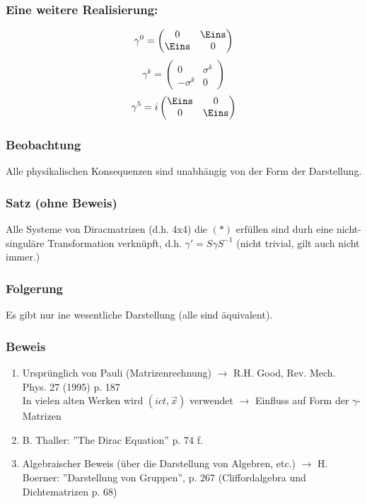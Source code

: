 \documentclass[twoside,a4paper]{scrartcl}
\renewcommand{\1}{\mathds{1}}
\newcommand{\ra}{\rightarrow}
\begin{document}
\subsubsection*{Eine weitere Realisierung:}
$$\gamma^0=\begin{pmatrix} 0& \Eins \\ \Eins & 0\end{pmatrix}$$
$$\gamma^k=\begin{pmatrix} 0& \sigma^k \\ -\sigma^k & 0\end{pmatrix}$$
$$\gamma^5=i\begin{pmatrix} \Eins & 0 \\ 0 & \Eins \end{pmatrix}$$
\subsubsection*{Beobachtung}
Alle physikalischen Konsequenzen sind unabhängig von der Form der Darstellung.
\subsubsection*{Satz (ohne Beweis)}
Alle Systeme von Diracmatrizen (d.h. 4x4) die $(*)$ erfüllen sind durh eine nicht-singuläre Transformation verknüpft, d.h. $\gamma'=S\gamma S^{-1}$ (nicht trivial, gilt auch nicht immer.)
\subsubsection*{Folgerung}
Es gibt nur ine wesentliche Darstellung (alle sind äquivalent).
\subsubsection*{Beweis}
\begin{enumerate}
\item Ursprünglich von Pauli (Matrizenrechnung) $\ra$ R.H. Good, Rev. Mech. Phys. 27 (1995) p. 187\\
In vielen alten Werken wird $(ict,\vec x)$ verwendet $\ra$ Einfluss auf Form der $\gamma$-Matrizen
\item B. Thaller: ''The Dirac Equation'' p. 74 f.
\item Algebraischer Beweis (über die Darstellung von Algebren, etc.) $\ra$ H. Boerner: ''Darstellung von Gruppen'', p. 267 (Cliffordalgebra und Dichtematrizen p. 68)
\end{enumerate}
\end{document}
